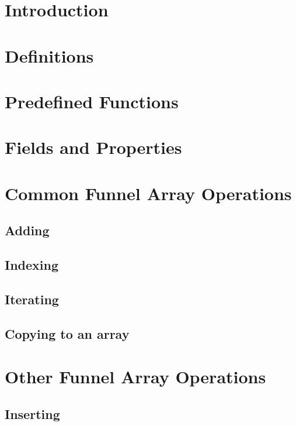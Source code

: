 \documentclass{article}
\begin{document}
	\begin{abstract}
	\end{abstract}

	\section{Introduction}

	\section{Definitions}

	\section{Predefined Functions}
	
	\section{Fields and Properties}
	
	\section{Common Funnel Array Operations}
	
	\subsection{Adding}
	
	\subsection{Indexing}
	
	\subsection{Iterating}
	
	\subsection{Copying to an array}
	
	\section{Other Funnel Array Operations}
	
	\subsection{Inserting}
	
\end{document}
